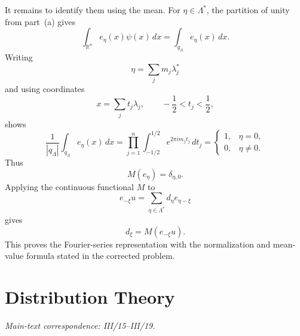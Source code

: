 \begin{solution}
It remains to identify them using the mean. For
\(\eta\in\Lambda^*\), the partition of unity from part~(a) gives
\[
\int_{\mathbb R^n} e_\eta(x)\psi(x)\,dx
=
\int_{q_\Lambda} e_\eta(x)\,dx.
\]
Writing
\[
\eta
=
\sum_j m_j\lambda_j^*
\]
and using coordinates
\[
x=\sum_j t_j\lambda_j,
\qquad
-\frac12<t_j<\frac12,
\]
shows
\[
\frac1{|q_\Lambda|}
\int_{q_\Lambda}e_\eta(x)\,dx
=
\prod_{j=1}^n
\int_{-1/2}^{1/2}
e^{2\pi i m_jt_j}\,dt_j
=
\begin{cases}
1,&\eta=0,\\
0,&\eta\ne0.
\end{cases}
\]
Thus
\[
M(e_\eta)=\delta_{\eta,0}.
\]
Applying the continuous functional \(M\) to
\[
e_{-\xi}u
=
\sum_{\eta\in\Lambda^*}
d_\eta e_{\eta-\xi}
\]
gives
\[
\boxed{
d_\xi
=
M(e_{-\xi}u).
}
\]
This proves the Fourier-series representation with the normalization and
mean-value formula stated in the corrected problem.
\end{solution}

\section{Distribution Theory}
\noindent\textit{Main-text correspondence: III/15--III/19.}

